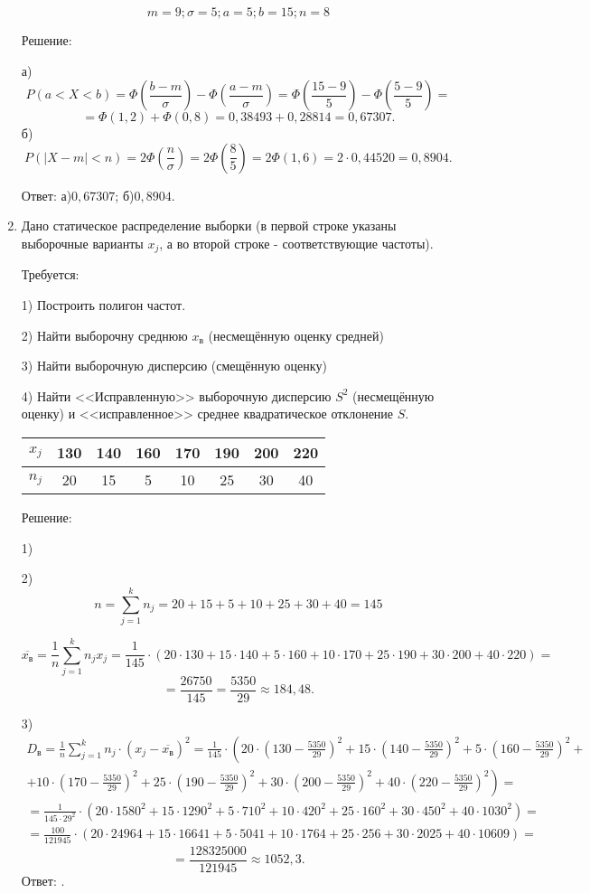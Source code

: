 \documentclass{article}
\begin{document}
\begin{enumerate}
$$m=9;\sigma=5;a=5;b=15;n=8$$
\begin{center}Решение:\end{center}
а) $$P(a<X<b)=\Phi\left(\frac{b-m}{\sigma}\right)-\Phi\left(\frac{a-m}{\sigma}\right)=\Phi\left(\frac{15-9}{5}\right)-\Phi\left(\frac{5-9}{5}\right)=$$
$$=\Phi(1,2)+\Phi(0,8)=0,38493+0,28814=0,67307.$$
б)
$$P (|X-m| < n)= 2\Phi\left(\frac{n}{\sigma}\right)=2\Phi\left(\frac{8}{5}\right)=2\Phi(1,6)=2\cdot0,44520=0,8904.$$

Ответ: а)$0,67307$; б)$0,8904$.

\item %
Дано статическое распределение выборки (в первой строке указаны выборочные варианты $x_j$, а во второй строке - соответствующие частоты).

Требуется:

1) Построить полигон частот.

2) Найти выборочну среднюю $x_\textit{в}$ (несмещённую оценку средней)

3) Найти выборочную дисперсию (смещённую оценку)

4) Найти <<Исправленную>> выборочную дисперсию $S^2$ (несмещённую оценку) и <<исправленное>> среднее квадратическое отклонение $S$.

\begin{center}
\begin{tabular}{|c|c|c|c|c|c|c|c|}
\hline
$x_j$ & 130 & 140 & 160 & 170 & 190 & 200 & 220 \\
\hline
$n_j$ & 20 & 15 & 5 & 10 & 25 & 30 & 40 \\
\hline
\end{tabular}
\end{center}
\begin{center}Решение:\end{center}
1)

2) $$n=\sum_{j=1}^k n_j=20+15+5+10+25+30+40=145$$

$$\overline{x_\textit{в}}=\frac{1}{n}\sum_{j=1}^k n_j x_j=\frac{1}{145}\cdot\left(20\cdot130+15\cdot140+5\cdot160+10\cdot170+25\cdot190+30\cdot200+40\cdot220\right)=$$
$$=\frac{26750}{145}=\frac{5350}{29}\approx184,48.$$

3)
\begin{multline*}
D_{\textit{в}}=\frac{1}{n}\sum_{j=1}^k n_j
\cdot\left(x_j-\overline{x_\textit{в}}\right)^2=
\frac{1}{145}\cdot\left(20\cdot\left(130-\frac{5350}{29}\right)^2+15\cdot\left(140-\frac{5350}{29}\right)^2+5\cdot\left(160-\frac{5350}{29}\right)^2+\right.\\
+\left.10\cdot\left(170-\frac{5350}{29}\right)^2+25\cdot\left(190-\frac{5350}{29}\right)^2+30\cdot\left(200-\frac{5350}{29}\right)^2+40\cdot\left(220-\frac{5350}{29}\right)^2\right)=\\
=\frac{1}{145\cdot29^2}\cdot\left(20\cdot1580^2+15\cdot1290^2+5\cdot710^2+10\cdot420^2+25\cdot160^2+30\cdot450^2+40\cdot1030^2\right)=\\
=\frac{100}{121945}\cdot\left(20\cdot24964+15\cdot16641+5\cdot5041+10\cdot1764+25\cdot256+30\cdot2025+40\cdot10609\right)=
\end{multline*}
$$=\frac{128325000}{121945}\approx1052,3.$$
Ответ: $ $.


\end{enumerate}
\end{document}

